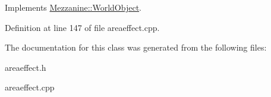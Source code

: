 Implements \hyperlink{classMezzanine_1_1WorldObject_a67e3c05d50cc1ff631beecd37d87255a}{Mezzanine::WorldObject}.



Definition at line 147 of file areaeffect.cpp.



The documentation for this class was generated from the following files:\begin{DoxyCompactItemize}
\item 
areaeffect.h\item 
areaeffect.cpp\end{DoxyCompactItemize}
